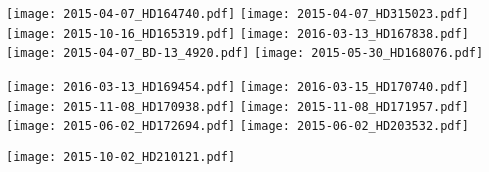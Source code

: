 \documentclass[a4paper]{aa}
\begin{document}
\newpage
\noindent
  \texttt{[image: 2015-04-07\_HD164740.pdf]}
  \texttt{[image: 2015-04-07\_HD315023.pdf]}\\
  \texttt{[image: 2015-10-16\_HD165319.pdf]}
  \texttt{[image: 2016-03-13\_HD167838.pdf]}\\
  \texttt{[image: 2015-04-07\_BD-13\_4920.pdf]}
  \texttt{[image: 2015-05-30\_HD168076.pdf]}
\newpage

\noindent
  \texttt{[image: 2016-03-13\_HD169454.pdf]}
  \texttt{[image: 2016-03-15\_HD170740.pdf]}\\
  \texttt{[image: 2015-11-08\_HD170938.pdf]}
  \texttt{[image: 2015-11-08\_HD171957.pdf]}\\
  \texttt{[image: 2015-06-02\_HD172694.pdf]}
  \texttt{[image: 2015-06-02\_HD203532.pdf]}

  \newpage
\noindent  
  \texttt{[image: 2015-10-02\_HD210121.pdf]}
\end{document}
